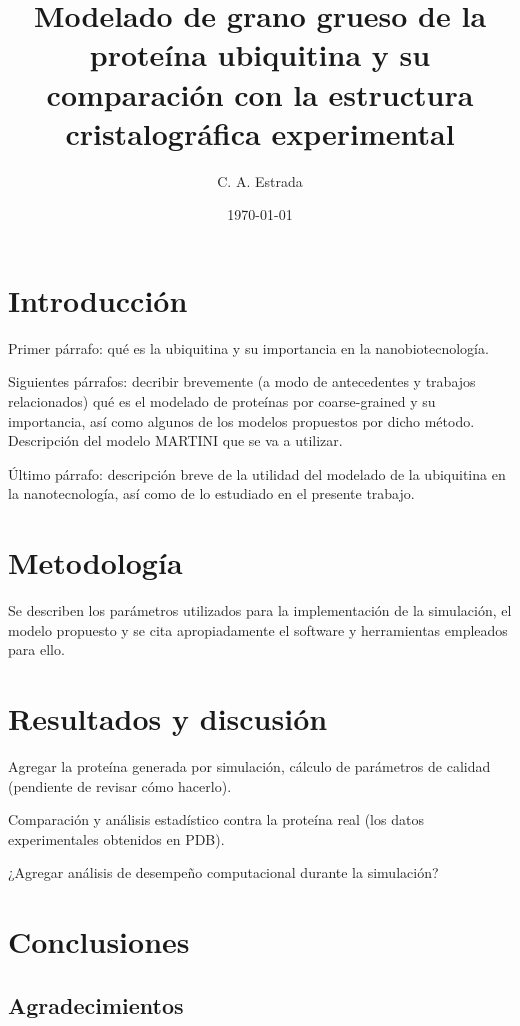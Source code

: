 \documentclass[a4paper,twocolumn,12pt]{article}
\title{\bf Modelado de grano grueso de la proteína ubiquitina y su comparación con la estructura cristalográfica experimental}
\date{\today}
\author{C. A. Estrada}
\begin{document}

\section{Introducción}
Primer párrafo: qué es la ubiquitina y su importancia en la nanobiotecnología. 

Siguientes párrafos: decribir brevemente (a modo de antecedentes y trabajos relacionados) qué es el modelado de proteínas por coarse-grained y su importancia, así como algunos de los modelos propuestos por dicho método. Descripción del modelo MARTINI que se va a utilizar.

Último párrafo: descripción breve de la utilidad del modelado de la ubiquitina en la nanotecnología, así como de lo estudiado en el presente trabajo.


\section{Metodología}
Se describen los parámetros utilizados para la implementación de la simulación, el modelo propuesto y se cita apropiadamente el software y herramientas \cite{R} empleados para ello.


\section{Resultados y discusión}
Agregar la proteína generada por simulación, cálculo de parámetros de calidad (pendiente de revisar cómo hacerlo).

Comparación y análisis estadístico contra la proteína real (los datos experimentales obtenidos en PDB).

¿Agregar análisis de desempeño computacional durante la simulación? 


\section{Conclusiones}


\subsection*{Agradecimientos}




\end{document}
